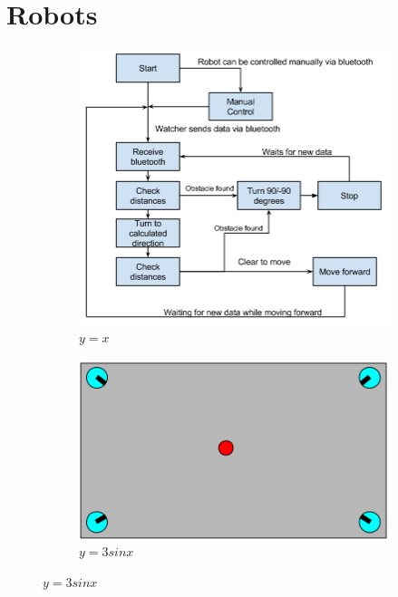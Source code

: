 \section{Robots}
\label{sec:robot}
\begin{figure}[H]
    \centering
    \begin{subfigure}[b]{0.3\textwidth}
        \centering
        \includegraphics[width=\textwidth]{figs/robotschema.png}
        \caption{$y=x$}
        \label{fig:robot0}
    \end{subfigure}
    \hfill
    \begin{subfigure}[b]{0.3\textwidth}
        \centering
        \includegraphics[width=\textwidth]{figs/scenario0.png}
        \caption{$y=3sinx$}
        \label{fig:robot1}
    \end{subfigure}

\end{figure}
